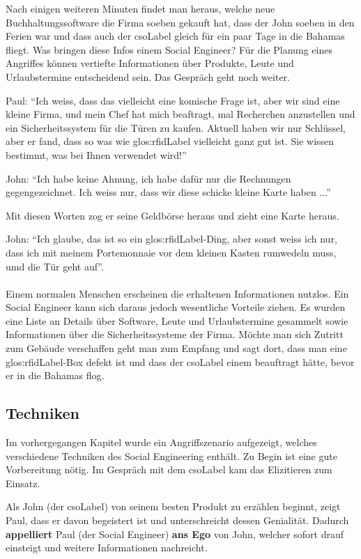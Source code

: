 Nach einigen weiteren Minuten findet man heraus, welche neue Buchhaltungssoftware die Firma soeben gekauft hat, dass der John soeben in den Ferien war und dass auch der \Gls{csoLabel} gleich für ein paar Tage in die Bahamas fliegt. Was bringen diese Infos einem Social Engineer? Für die Planung eines Angriffes können vertiefte Informationen über Produkte, Leute und Urlaubstermine entscheidend sein. Das Gespräch geht noch weiter.

Paul: "`Ich weiss, dass das vielleicht eine komische Frage ist, aber wir sind eine kleine Firma, und mein Chef hat mich beaftragt, mal Recherchen anzustellen und ein Sicherheitssystem für die Türen zu kaufen. Aktuell haben wir nur Schlüssel, aber er fand, dass so was wie \gls{glos:rfidLabel} vielleicht ganz gut ist. Sie wissen bestimmt, was bei Ihnen verwendet wird!"'

John: "`Ich habe keine Ahnung, ich habe dafür nur die Rechnungen gegengezeichnet. Ich weiss nur, dass wir diese schicke kleine Karte haben ..."'

Mit diesen Worten zog er seine Geldbörse heraus und zieht eine Karte heraus.

John: "`Ich glaube, das ist so ein \gls{glos:rfidLabel}-Ding, aber sonst weiss ich nur, dass ich mit meinem Portemonnaie vor dem kleinen Kasten rumwedeln muss, umd die Tür geht auf"'.
\\
\\
Einem normalen Menschen erscheinen die erhaltenen Informationen nutzlos. Ein Social Engineer kann sich daraus jedoch wesentliche Vorteile ziehen. Es wurden eine Liste an Details über Software, Leute und Urlaubstermine gesammelt sowie Informationen über die Sicherheitssysteme der Firma.
Möchte man sich Zutritt zum Gebäude verschaffen geht man zum Empfang und sagt dort, dass man eine \gls{glos:rfidLabel}-Box defekt ist und dass der \Gls{csoLabel} einem beauftragt hätte, bevor er in die Bahamas flog.

\subsection{Techniken}
\label{sec:Elizitieren:techniken}
Im vorhergegangen Kapitel wurde ein Angriffszenario aufgezeigt, welches verschiedene Techniken des Social Engineering enthält. Zu Begin ist eine gute Vorbereitung nötig. Im Gespräch mit dem \Gls{csoLabel} kam das Elizitieren zum Einsatz. 

Als John (der \Gls{csoLabel}) von seinem besten Produkt zu erzählen beginnt, zeigt Paul, dass er davon begeistert ist und unterschreicht dessen Genialität. Dadurch \textbf{appelliert} Paul (der Social Engineer) \textbf{ans Ego} von John, welcher sofort drauf einsteigt und weitere Informationen nachreicht.

